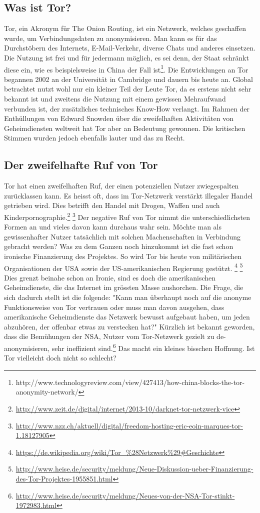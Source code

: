 \subsection{Was ist Tor?}
Tor, ein Akronym für The Onion Routing, ist ein Netzwerk, welches geschaffen wurde, um Verbindungsdaten zu anonymisieren. Man kann es für das Durchstöbern des Internets, E-Mail-Verkehr, diverse Chats und anderes einsetzen. Die Nutzung ist frei und für jedermann möglich, es sei denn, der Staat schränkt diese ein, wie es beispielsweise in China der Fall ist\footnote{http://www.technologyreview.com/view/427413/how-china-blocks-the-tor-anonymity-network/}.
Die Entwicklungen an Tor begannen 2002 an der Universität in Cambridge und dauern bis heute an. Global betrachtet nutzt wohl nur ein kleiner Teil der Leute Tor, da es erstens nicht sehr bekannt ist und zweitens die Nutzung mit einem gewissen Mehraufwand verbunden ist, der zusätzliches technisches Know-How verlangt. Im Rahmen der Enthüllungen von Edward Snowden über die zweifelhaften Aktivitäten von Geheimdiensten weltweit hat Tor aber an Bedeutung gewonnen. Die kritischen Stimmen wurden jedoch ebenfalls lauter und das zu Recht.

\subsection{Der zweifelhafte Ruf von Tor}
Tor hat einen zweifelhaften Ruf, der einen potenziellen Nutzer zwiegespalten zurücklassen kann. Es heisst oft, dass im Tor-Netzwerk verstärkt illegaler Handel getrieben wird. Dies betrifft den Handel mit Drogen, Waffen und auch Kinderpornographie.\footnote{\url{http://www.zeit.de/digital/internet/2013-10/darknet-tor-netzwerk-vice}} \footnote{\url{http://www.nzz.ch/aktuell/digital/freedom-hosting-eric-eoin-marques-tor-1.18127905}}
Der negative Ruf von Tor nimmt die unterschiedlichsten Formen an und vieles davon kann durchaus wahr sein. Möchte man als gewissenhafter Nutzer tatsächlich mit solchen Machenschaften in Verbindung gebracht werden? Was zu dem Ganzen noch hinzukommt ist die fast schon ironische Finanzierung des Projektes. So wird Tor bis heute von militärischen Organisationen der USA sowie der US-amerikanischen Regierung  gestützt.
\footnote{\url{https://de.wikipedia.org/wiki/Tor_\%28Netzwerk\%29\#Geschichte}}
\footnote{\url{http://www.heise.de/security/meldung/Neue-Diskussion-ueber-Finanzierung-des-Tor-Projektes-1955851.html}}
Dies grenzt beinahe schon an Ironie, sind es doch die amerikanischen Geheimdienste, die das Internet im grössten Masse aushorchen. Die Frage, die sich dadurch stellt ist die folgende: "Kann man überhaupt noch auf die anonyme Funktionsweise von Tor vertrauen oder muss man davon ausgehen, dass amerikanische Geheimdienste das Netzwerk bewusst aufgebaut haben, um jeden abzuhören, der offenbar etwas zu verstecken hat?" Kürzlich ist bekannt geworden, dass die Bemühungen der NSA, Nutzer vom Tor-Netzwerk gezielt zu de-anonymisieren, sehr ineffizient sind.\footnote{\url{http://www.heise.de/security/meldung/Neues-von-der-NSA-Tor-stinkt-1972983.html}}
Das macht ein kleines bisschen Hoffnung. Ist Tor vielleicht doch nicht so schlecht?


